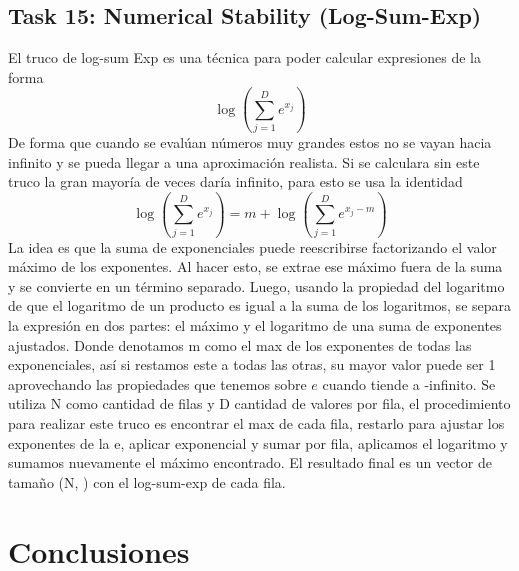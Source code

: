 \documentclass[12pt]{article}
\begin{document}
\subsection*{Task 15: Numerical Stability (Log-Sum-Exp)}
El truco de log-sum Exp es una técnica para poder calcular expresiones de la forma \[
\log\left(\sum_{j=1}^{D} e^{x_j}\right)
\]
De forma que cuando se evalúan números muy grandes estos no se vayan hacia infinito y se pueda llegar a una aproximación realista. Si se calculara sin este truco la gran mayoría de veces daría infinito, para esto se usa la identidad \[
\log\left(\sum_{j=1}^{D} e^{x_j}\right)
=
m+\log\left(\sum_{j=1}^{D} e^{x_j-m}\right)
\]
La idea es que la suma de exponenciales puede reescribirse factorizando el valor máximo de los exponentes. Al hacer esto, se extrae ese máximo fuera de la suma y se convierte en un término separado. Luego, usando la propiedad del logaritmo de que el logaritmo de un producto es igual a la suma de los logaritmos, se separa la expresión en dos partes: el máximo y el logaritmo de una suma de exponentes ajustados.
Donde denotamos m como el max de los exponentes de todas las exponenciales, así si restamos este a todas las otras, su mayor valor puede ser 1 aprovechando las propiedades que tenemos sobre $e$ cuando tiende a -infinito. Se utiliza N como cantidad de filas y D cantidad de valores por fila, el procedimiento para realizar este truco es encontrar el max de cada fila, restarlo para ajustar los exponentes de la e, aplicar exponencial y sumar por fila, aplicamos el logaritmo y sumamos nuevamente el máximo encontrado. El resultado final es un vector de tamaño (N, ) con el log-sum-exp de cada fila.

\section*{Conclusiones}
\end{document}
